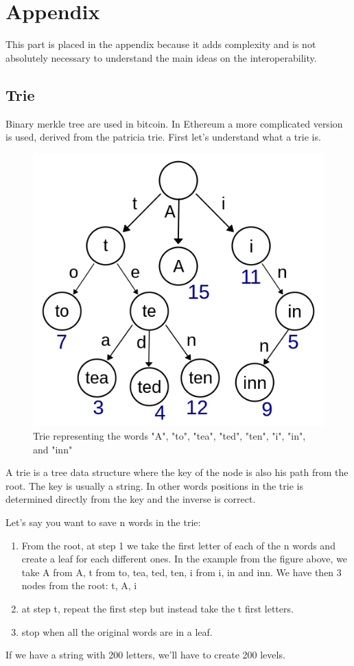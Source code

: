 \chapter{Appendix}
This part is placed in the appendix because it adds complexity and is not absolutely necessary to understand the main ideas on the interoperability. 

\section{Trie}
Binary merkle tree are used in bitcoin. 
In Ethereum a more complicated version is used, derived from the patricia trie. First let's understand what a trie is. 
\begin{figure}[H]
    \centering
\includegraphics[width=0.3\linewidth]{background/trie.png}
    \caption{Trie representing the words "A", "to", "tea", "ted", "ten", "i", "in", and "inn"}
    \label{fig:trie}
\end{figure}
A trie is a tree data structure where the key of the node is also his path from the root. The key is usually a string.
In other words positions in the trie is determined directly from the key and the inverse is correct. 

Let's say you want to save n words in the trie:
\begin{enumerate}
    \item From the root, at step 1 we take the first letter of each of the n words and create a leaf for each different ones. In the example from the figure above, we  take A from A, t from to, tea, ted, ten, i from i, in and inn. We have then 3 nodes from the root: t, A, i
    \item at step t, repeat the first step but instead take the t first letters. 
    \item stop when all the original words are in a leaf. 
\end{enumerate}
If we have a string with 200 letters, we'll have to create 200 levels.
